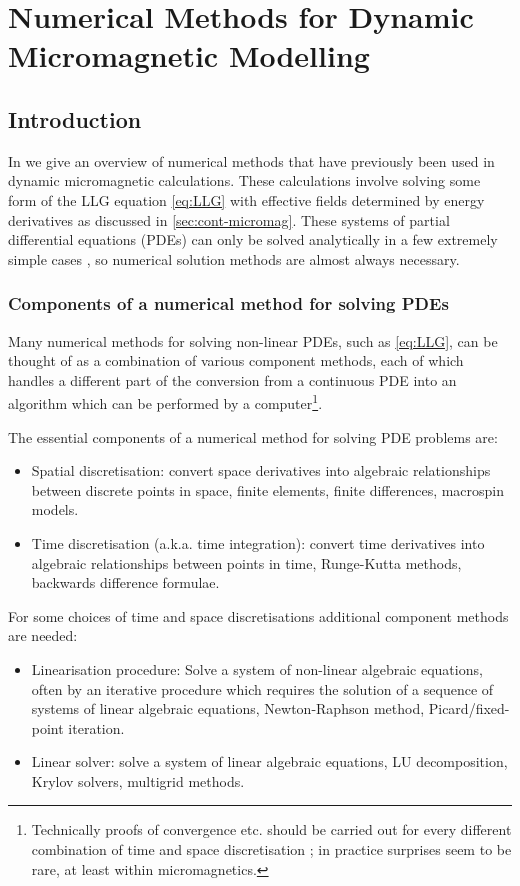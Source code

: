 \chapter{Numerical Methods for Dynamic Micromagnetic Modelling}
\label{sec:numer-meth-micr}

\section{Introduction}

In  we give an overview of numerical methods that have previously been used in dynamic micromagnetic calculations.
These calculations involve solving some form of the LLG equation \cref{eq:LLG} with effective fields determined by energy derivatives as discussed in \cref{sec:cont-micromag}.
These systems of partial differential equations (PDEs) can only be solved analytically in a few extremely simple cases \cite{Aharoni1996}, so numerical solution methods are almost always necessary.


\subsection{Components of a numerical method for solving PDEs}

Many numerical methods for solving non-linear PDEs, such as \cref{eq:LLG}, can be thought of as a combination of various component methods, each of which handles a different part of the conversion from a continuous PDE into an algorithm which can be performed by a computer\footnote{Technically proofs of convergence etc. should be carried out for every different combination of time and space discretisation \cite[382]{Iserles2009}; in practice surprises seem to be rare, at least within micromagnetics.}.

The essential components of a numerical method for solving PDE problems are:
\begin{itemize}
\item Spatial discretisation: convert space derivatives into algebraic relationships between discrete points in space, \eg finite elements, finite differences, macrospin models. 
\item Time discretisation (a.k.a. time integration):  convert time derivatives into algebraic relationships between points in time, \eg Runge-Kutta methods, backwards difference formulae.
\end{itemize}
For some choices of time and space discretisations additional component methods are needed:
\begin{itemize}
\item Linearisation procedure: Solve a system of non-linear algebraic equations, often by an iterative procedure which requires the solution of a sequence of systems of linear algebraic equations, \eg Newton-Raphson method, Picard/fixed-point iteration. 
\item Linear solver: solve a system of linear algebraic equations, \eg LU decomposition, Krylov solvers, multigrid methods. 
\end{itemize}

